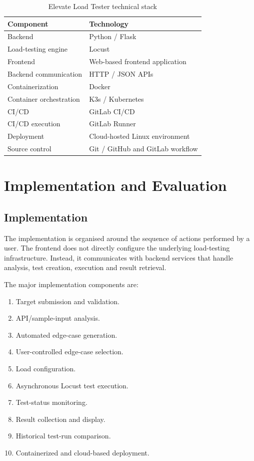 \documentclass{tietreport}
\begin{document}
\begin{table}[H]
\centering
\begin{tabular}{p{} p{}}
\toprule
\textbf{Component} & \textbf{Technology} \\
\midrule
Backend & Python / Flask \\
Load-testing engine & Locust \\
Frontend & Web-based frontend application \\
Backend communication & HTTP / JSON APIs \\
Containerization & Docker \\
Container orchestration & K3s / Kubernetes \\
CI/CD & GitLab CI/CD \\
CI/CD execution & GitLab Runner \\
Deployment & Cloud-hosted Linux environment \\
Source control & Git / GitHub and GitLab workflow \\
\bottomrule
\end{tabular}
\caption{Elevate Load Tester technical stack}
\label{tab:techstack}
\end{table}


\chapter{Implementation and Evaluation}

\section{Implementation}

The implementation is organised around the sequence of actions performed by a user. The frontend does not directly configure the underlying load-testing infrastructure. Instead, it communicates with backend services that handle analysis, test creation, execution and result retrieval.

The major implementation components are:

\begin{enumerate}
    \item Target submission and validation.
    \item API/sample-input analysis.
    \item Automated edge-case generation.
    \item User-controlled edge-case selection.
    \item Load configuration.
    \item Asynchronous Locust test execution.
    \item Test-status monitoring.
    \item Result collection and display.
    \item Historical test-run comparison.
    \item Containerized and cloud-based deployment.
\end{enumerate}
\end{document}
